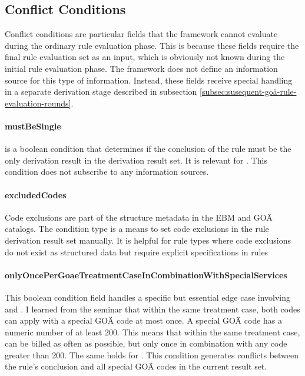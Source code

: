 \subsection{Conflict Conditions}\label{subsec:conflict-conditions}
Conflict conditions are particular fields that the framework cannot evaluate during the ordinary rule evaluation phase.
This is because these fields require the final rule evaluation set as an input, which is obviously not known during the initial rule evaluation phase.
The framework does not define an information source for this type of information.
Instead, these fields receive special handling in a separate derivation stage described in subsection \ref{subsec:susequent-goä-rule-evaluation-rounds}.
\paragraph{mustBeSingle}
 is a boolean condition that determines if the conclusion of the rule must be the only derivation result in the derivation result set.
It is relevant for .
This condition does not subscribe to any information sources.

\paragraph{excludedCodes}
Code exclusions are part of the structure metadata in the EBM and GOÄ catalogs.
The \excludedCodes condition type is a means to set code exclusions in the rule derivation result set manually.
It is helpful for rule types where code exclusions do not exist as structured data but require explicit specifications in rules

\paragraph{onlyOncePerGoaeTreatmentCaseInCombinationWithSpecialServices}
This boolean condition field handles a specific but essential edge case involving  and .
I learned from the \PVC seminar that within the same treatment case, both codes can apply with a special GOÄ code at most once.
A special GOÄ code has a numeric number of at least 200.
This means that within the same treatment case,  can be billed as often as possible, but only once in combination with any code greater than 200.
The same holds for .
This condition generates conflicts between the rule's conclusion and all special GOÄ codes in the current result set.

